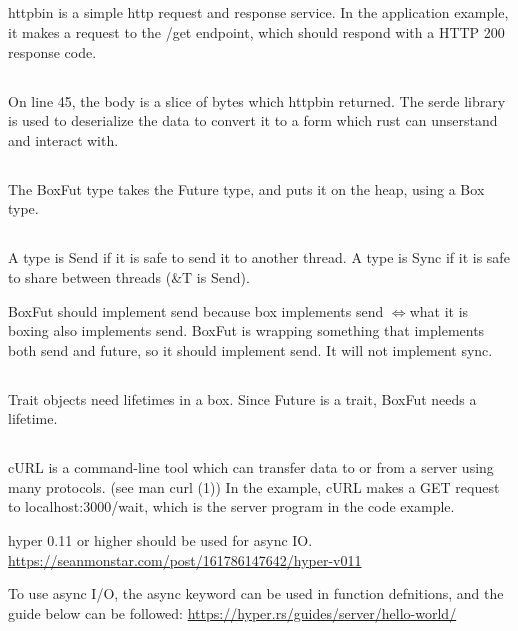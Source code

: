 \documentclass[letterpaper]{article}
\begin{document}
\subsection{}
httpbin is a simple http request and response service.
In the application example, it makes a request to the /get endpoint,
which should respond with a HTTP 200 response code.

\subsection{}
On line 45, the body is a slice of bytes which httpbin returned.
The serde library is used to deserialize the data to convert it to a form
which rust can unserstand and interact with. 

\subsection{}
The BoxFut type takes the Future type, and puts it on the heap, using a Box
type.

\subsection{}
A type is Send if it is safe to send it to another thread.
A type is Sync if it is safe to share between threads (\&T is Send).

BoxFut should implement send because box implements send $\iff $what it is boxing
also implements send. BoxFut is wrapping something that implements both send 
and future, so it should implement send. It will not implement sync.

\subsection{}
Trait objects need lifetimes in a box.
Since Future is a trait, BoxFut needs a lifetime.

\subsection{}
cURL is a command-line tool which can transfer data to or from a server using
many protocols. (see man curl (1)) 
In the example, cURL makes a GET request to localhost:3000/wait, which is
the server program in the code example.

hyper 0.11 or higher should be used for async IO.
\url{https://seanmonstar.com/post/161786147642/hyper-v011}

To use async I/O, the async keyword can be used in function defnitions,
and the guide below can be followed:
\url{https://hyper.rs/guides/server/hello-world/}
\end{document}
